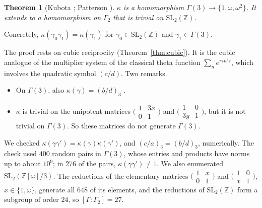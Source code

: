 \documentclass[11pt]{article}
\numberwithin{equation}{section}
\newcommand{\OO}{\mathbb Z[\omega]}
\newcommand{\Z}{\mathbb Z}
\newtheorem{theorem}{Theorem}
\theoremstyle{definition}
\theoremstyle{remark}
\begin{document}
\begin{theorem}[Kubota \cite{Kub66,Kub69}; Patterson \cite{Pat77}]\label{thm:kubota}
$\kappa$ is a homomorphism $\Gamma(3)\to\{1,\omega,\omega^2\}$. It extends to a homomorphism on $\Gamma_2$ that is
trivial on $\mathrm{SL}_2(\Z)$.
\end{theorem}

Concretely, $\kappa(\gamma_0\gamma_1)=\kappa(\gamma_1)$ for $\gamma_0\in\mathrm{SL}_2(\Z)$ and $\gamma_1\in\Gamma(3)$.

The proof rests on cubic reciprocity (Theorem~\ref{thm:cubic}). It is the cubic analogue of the multiplier
system of the classical theta function $\sum_ne^{\pi in^2\tau}$, which involves the quadratic symbol $(c/d)$.
Two remarks.
\begin{itemize}
\item On $\Gamma(3)$, also $\kappa(\gamma)=(b/d)_3$ \cite[\S5.1]{DR}.
\item $\kappa$ is trivial on the unipotent matrices $\bigl(\begin{smallmatrix}1&3x\\0&1\end{smallmatrix}\bigr)$ and
$\bigl(\begin{smallmatrix}1&0\\3y&1\end{smallmatrix}\bigr)$, but it is not trivial on $\Gamma(3)$. So these matrices do not
generate $\Gamma(3)$.
\end{itemize}
We checked $\kappa(\gamma\gamma')=\kappa(\gamma)\kappa(\gamma')$, and $(c/a)_3=(b/d)_3$, numerically. The check used $400$ random
pairs in $\Gamma(3)$, whose entries and products have norms up to about $10^9$; in $276$ of the pairs,
$\kappa(\gamma\gamma')\ne1$. We also enumerated $\mathrm{SL}_2(\OO/3)$. The reductions of the elementary matrices
$\bigl(\begin{smallmatrix}1&x\\0&1\end{smallmatrix}\bigr)$ and $\bigl(\begin{smallmatrix}1&0\\x&1\end{smallmatrix}\bigr)$,
$x\in\{1,\omega\}$, generate all $648$ of its elements, and the reductions of $\mathrm{SL}_2(\Z)$ form a subgroup of
order $24$, so $[\Gamma:\Gamma_2]=27$.
\end{document}
